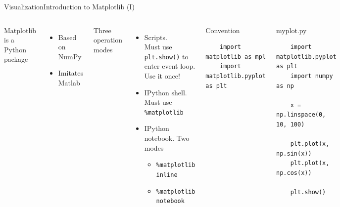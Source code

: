 \documentclass[10pt,compress]{beamer} %
\begin{document}
\begin{frame}[fragile]{Visualization}{Introduction to Matplotlib (I)}
	\begin{columns}
	Matplotlib is a Python package
	\begin{itemize}
		\item Based on NumPy
		\item Imitates Matlab
	\end{itemize}
	Three operation modes
	\begin{itemize}
		\item Scripts. \\Must use \texttt{plt.show()} to enter event loop. Use it once!
		\item IPython shell. \\Must use \texttt{\%matplotlib}
		\item IPython notebook. Two modes
		\begin{itemize}
			\item \texttt{\%matplotlib inline}
			\item \texttt{\%matplotlib notebook}
		\end{itemize}
	\end{itemize}

	\begin{block}{\footnotesize{Convention}}
	\vspace{-0.2cm} 
	\begin{lstlisting}
	import matplotlib as mpl
	import matplotlib.pyplot as plt
	\end{lstlisting}
	\vspace{-0.2cm} 
	\end{block}

	\begin{exampleblock}{\footnotesize{myplot.py}}
	\vspace{-0.2cm} 
	\begin{lstlisting}
	import matplotlib.pyplot as plt
	import numpy as np

	x = np.linspace(0, 10, 100)

	plt.plot(x, np.sin(x))
	plt.plot(x, np.cos(x))

	plt.show()
	\end{lstlisting}
	\vspace{-0.2cm} 
	\end{exampleblock}

	\end{columns}
\end{frame}
\end{document}
